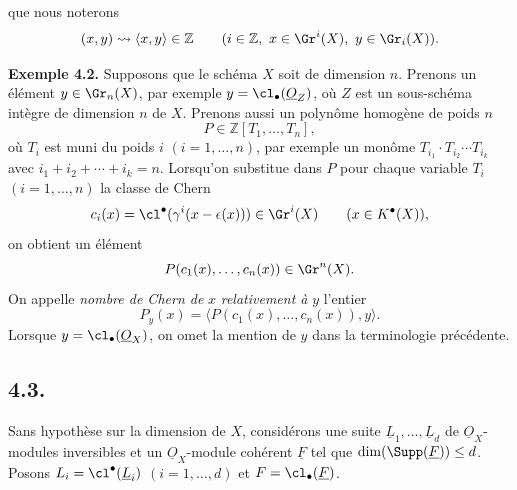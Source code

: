 
que nous noterons
\[
 (x,y)\rightsquigarrow \langle x,y\rangle\in\mathbb Z
 \qquad (i\in\mathbb Z,\ x\in\Gr^i(X),\ y\in\Gr_i(X)).
\]

\textbf{Exemple 4.2.} Supposons que le schéma \(X\) soit de dimension \(n\). Prenons un élément \(y\in\Gr_n(X)\), par exemple \(y=\cl_\bullet(\underline{O}_Z)\), où \(Z\) est un sous-schéma intègre de dimension \(n\) de \(X\). Prenons aussi un polynôme homogène de poids \(n\)
\[
 P\in\mathbb Z[T_1,\ldots,T_n],
\]
où \(T_i\) est muni du poids \(i\) \((i=1,\ldots,n)\), par exemple un monôme \(T_{i_1}\cdot T_{i_2}\cdots T_{i_k}\) avec \(i_1+i_2+\cdots+i_k=n\). Lorsqu'on substitue dans \(P\) pour chaque variable \(T_i\) \((i=1,\ldots,n)\) la classe de Chern
\[
 c_i(x)=\cl^{\bullet}(\gamma^i(x-\epsilon(x)))\in\Gr^i(X)
 \qquad(x\in K^{\bullet}(X)),
\]
on obtient un élément
\[
 P(c_1(x),\ldots,c_n(x))\in\Gr^n(X).
\]
On appelle \emph{nombre de Chern de} \(x\) \emph{relativement à} \(y\) l'entier
\[
 P_y(x)=\bigl\langle P(c_1(x),\ldots,c_n(x)),y\bigr\rangle.
\]
Lorsque \(y=\cl_\bullet(\underline{O}_X)\), on omet la mention de \(y\) dans la terminologie précédente.

\subsection*{4.3.}
Sans hypothèse sur la dimension de \(X\), considérons une suite \(\underline{L}_1,\ldots,\underline{L}_d\) de \(\underline{O}_X\)-modules inversibles et un \(\underline{O}_X\)-module cohérent \(\underline{F}\) tel que \(\dim(\Supp(\underline{F}))\leq d\). Posons \(L_i=\cl^{\bullet}(\underline L_i)\) \((i=1,\ldots,d)\) et \(F=\cl_\bullet(\underline F)\).

